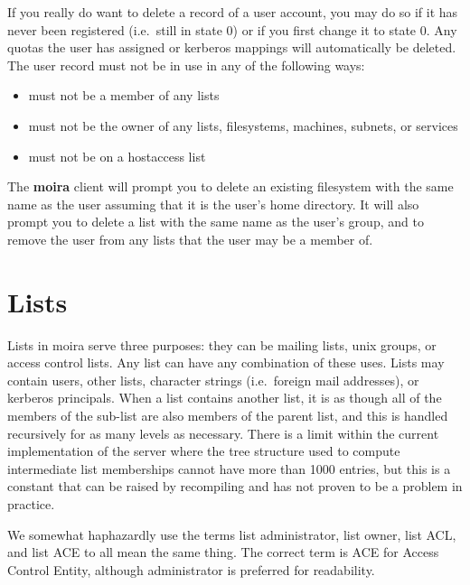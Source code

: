 \documentclass{book}
\begin{document}
If you really do want to delete a record of a user account, you may do
so if it has never been registered (i.e.\ still in state 0) or if you
first change it to state 0.  Any quotas the user has assigned or
kerberos mappings will automatically be deleted.  The user record must
not be in use in any of the following ways:
\begin{itemize}
\item must not be a member of any lists
\item must not be the owner of any lists, filesystems, machines,
subnets, or services
\item must not be on a hostaccess list
\end{itemize}
The {\bf moira} client will prompt you to delete an existing filesystem
with the same name as the user assuming that it is the user's home
directory.  It will also prompt you to delete a list with the same
name as the user's group, and to remove the user from any lists that
the user may be a member of.


\section{Lists}
\label{lists}

Lists in moira serve three purposes: they can be mailing lists,
{\sc unix} groups, or access control lists.  Any list can have any
combination of these uses.  Lists may contain users, other lists,
character strings (i.e.\ foreign mail addresses), or kerberos
principals.  When a list contains another list, it is as though all of
the members of the sub-list are also members of the parent list, and
this is handled recursively for as many levels as necessary.  There is
a limit within the current implementation of the server where the tree
structure used to compute intermediate list memberships cannot have
more than 1000 entries, but this is a constant that can be raised by
recompiling and has not proven to be a problem in practice.

We somewhat haphazardly use the terms list administrator, list owner,
list ACL, and list ACE to all mean the same thing.  The correct term
is ACE  for Access Control
Entity, although administrator is preferred for readability.
\end{document}
